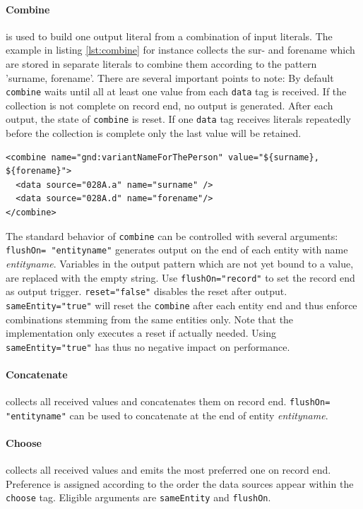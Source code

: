\documentclass[12pt,a4paper]{article}
\begin{document}
\paragraph{Combine}

is used to build one output literal from a combination of input literals. The  example in listing \ref{lst:combine} for instance collects the sur- and forename which are stored in separate literals to combine them according to the pattern 'surname, forename'.
There are several important points to note: By default {\tt combine} waits until all at least one value from each {\tt data} tag is received. If the collection is not complete on record end, no output is generated. After each output, the state of {\tt combine} is reset. If one {\tt data} tag receives literals repeatedly before the collection is complete only the last value will be retained.

\begin{lstlisting}[float=htb, label=lst:combine,caption=Combining data from two different data sources.]
<combine name="gnd:variantNameForThePerson" value="${surname}, ${forename}">
  <data source="028A.a" name="surname" />
  <data source="028A.d" name="forename"/>
</combine>
\end{lstlisting}

The standard behavior of {\tt combine} can be controlled with several arguments:
{\tt flushOn= "entityname"} generates output on the end of each entity with name {\it entityname}. Variables in the output pattern which are not yet bound to a value, are replaced with the empty string. Use {\tt flushOn="record"} to set the record end as output trigger.
{\tt reset="false"} disables the reset after output.
{\tt sameEntity="true"} will reset the {\tt combine} after each entity end and thus enforce combinations stemming from the same entities only. Note that the implementation only executes a reset if actually needed. Using {\tt sameEntity="true"} has thus no negative impact on performance.

\paragraph{Concatenate}
collects all received values and concatenates them on record end. {\tt flushOn= "entityname"} can be used to concatenate at the end of entity {\it entityname}.

\paragraph{Choose}
collects all received values and emits the most preferred one on record end. Preference is assigned according to the order the data sources appear within the {\tt choose} tag.  Eligible arguments are {\tt sameEntity} and {\tt flushOn}.
\end{document}
